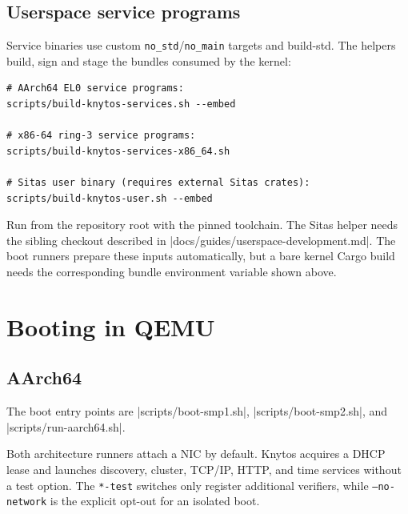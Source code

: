 \subsection{Userspace service programs}

Service binaries use custom \texttt{no\_std}/\texttt{no\_main} targets and
build-std. The helpers build, sign and stage the bundles consumed by the kernel:

\begin{verbatim}
# AArch64 EL0 service programs:
scripts/build-knytos-services.sh --embed

# x86-64 ring-3 service programs:
scripts/build-knytos-services-x86_64.sh

# Sitas user binary (requires external Sitas crates):
scripts/build-knytos-user.sh --embed
\end{verbatim}

Run from the repository root with the pinned toolchain. The Sitas helper needs
the sibling checkout described in \repofile|docs/guides/userspace-development.md|.
The boot runners prepare these inputs automatically, but a bare kernel Cargo build
needs the corresponding bundle environment variable shown above.

\section{Booting in QEMU}

\subsection{AArch64}

The boot entry points are \repofile|scripts/boot-smp1.sh|,
\repofile|scripts/boot-smp2.sh|, and \repofile|scripts/run-aarch64.sh|.

Both architecture runners attach a NIC by default. Knytos acquires a DHCP
lease and launches discovery, cluster, TCP/IP, HTTP, and time services without
a test option. The \texttt{*-test} switches only register additional verifiers, while
\texttt{--no-network} is the explicit opt-out for an isolated boot.

